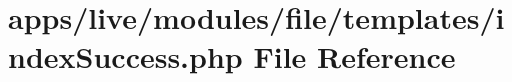 \hypertarget{live_2modules_2file_2templates_2index_success_8php}{\section{apps/live/modules/file/templates/index\-Success.php File Reference}
\label{live_2modules_2file_2templates_2index_success_8php}
}

